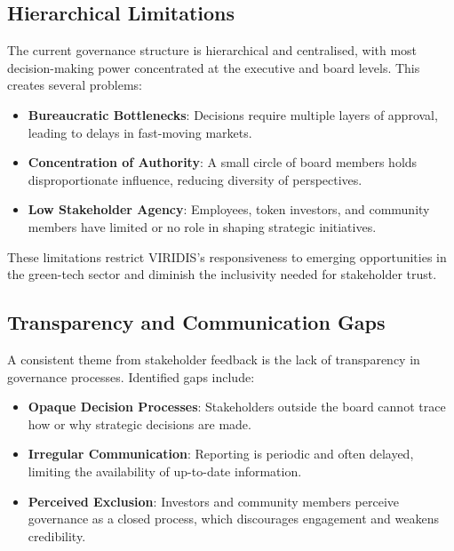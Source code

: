 \documentclass[
  english,
  12pt,
  oneside,
  open=any]{scrbook}
\providecommand{\tightlist}{%
  \setlength{\itemsep}{0pt}\setlength{\parskip}{0pt}}\usepackage{longtable,booktabs,array}
\begin{document}
\subsection{Hierarchical Limitations}\label{sec-hier}

The current governance structure is hierarchical and centralised, with
most decision-making power concentrated at the executive and board
levels. This creates several problems:

\begin{itemize}
\tightlist
\item
  \textbf{Bureaucratic Bottlenecks}: Decisions require multiple layers
  of approval, leading to delays in fast-moving markets.\\
\item
  \textbf{Concentration of Authority}: A small circle of board members
  holds disproportionate influence, reducing diversity of
  perspectives.\\
\item
  \textbf{Low Stakeholder Agency}: Employees, token investors, and
  community members have limited or no role in shaping strategic
  initiatives.
\end{itemize}

These limitations restrict VIRIDIS's responsiveness to emerging
opportunities in the green-tech sector and diminish the inclusivity
needed for stakeholder trust.

\subsection{Transparency and Communication Gaps}\label{sec-comm}

A consistent theme from stakeholder feedback is the lack of transparency
in governance processes. Identified gaps include:

\begin{itemize}
\tightlist
\item
  \textbf{Opaque Decision Processes}: Stakeholders outside the board
  cannot trace how or why strategic decisions are made.\\
\item
  \textbf{Irregular Communication}: Reporting is periodic and often
  delayed, limiting the availability of up-to-date information.\\
\item
  \textbf{Perceived Exclusion}: Investors and community members perceive
  governance as a closed process, which discourages engagement and
  weakens credibility.
\end{itemize}
\end{document}
